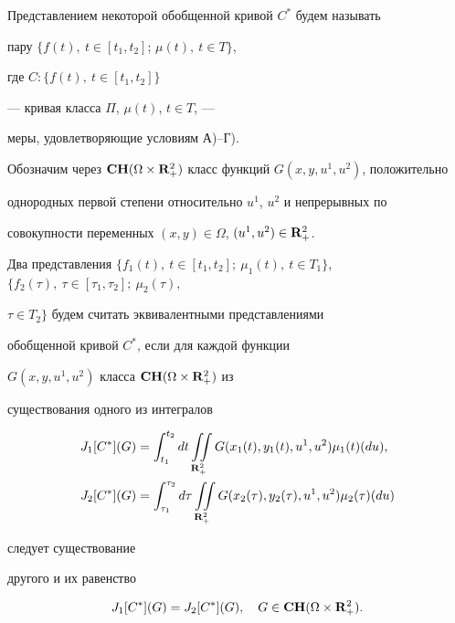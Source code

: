 Представлением некоторой обобщенной кривой $C^*$ будем называть


пару $\{f(t),\ t\in[t_1,t_2]$; $\mu(t),\ t\in T\}$,


где $C:\{f(t),\ t\in[t_1,t_2]\}$


--- кривая класса $\Pi$, $\mu(t)$, $t\in T$, ---


меры, удовлетворяющие условиям А)--Г).





Обозначим через $\bold{CH}(\Omega \times {\bold R}


^2_+)$ класс функций $G(x,y,u^1,u^2)$, положительно


однородных первой степени относительно $u^1$, $u^2$ и непрерывных по


совокупности переменных $(x,y)\in \Omega$, $(u^1,u^2)\in {\bold R}^2_+$.





Два представления $\{f_1(t),\ t\in[t_1,t_2];\ \mu_1(t),\ t\in


T_1\}$, $\{f_2(\tau),\ \tau\in[\tau_1,\tau_2];\ \mu_2(\tau)$,


$\tau\in T_2\}$ будем считать эквивалентными представлениями


обобщенной кривой $C^*$, если для каждой функции


$G(x,y,u^1,u^2)$ класса $\bold{CH}(\Omega \times {\bold R}^2_+)$ из


существования одного из интегралов


\begin{align*}


J_1[C^*](G)&=\int_{t_1}^{t_2}dt\iint\limits_{


{\bold R}^2_+}G(x_1(t),y_1(t),u^1,u^2)\mu_1(t)(du),\\


%


J_2[C^*](G)&=\int_{\tau_1}^{\tau_2}d\tau\iint\limits_{ {\bold R}


^2_+}G(x_2(\tau),y_2(\tau),u^1,u^2)\mu_2(\tau)(du)


\end{align*}


следует существование


другого и их равенство


\begin{equation}


J_1[C^*](G)=J_2[C^*](G),\quad G\in \bold{CH}(\Omega \times


{\bold R}^2_+).


\end{equation}


